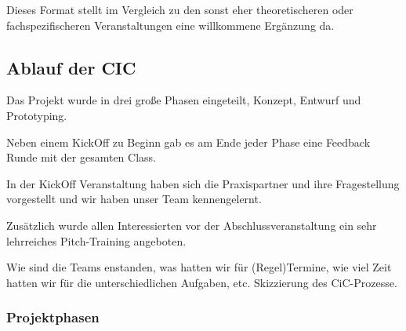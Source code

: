     \vspace{1em}
    \vspace{1em}

    Dieses Format stellt im Vergleich zu den sonst eher theoretischeren oder fachspezifischeren Veranstaltungen eine willkommene Ergänzung da.

    \subsection{Ablauf der CIC}

        Das Projekt wurde in drei große Phasen eingeteilt, Konzept, Entwurf und Prototyping.

        Neben einem KickOff zu Beginn gab es am Ende jeder Phase eine Feedback Runde mit der gesamten Class.
        
        In der KickOff Veranstaltung haben sich die Praxispartner und ihre Fragestellung vorgestellt und wir haben unser Team kennengelernt.



        Zusätzlich wurde allen Interessierten vor der Abschlussveranstaltung ein sehr lehrreiches Pitch-Training angeboten.

        Wie sind die Teams enstanden, was hatten wir für (Regel)Termine, wie viel Zeit hatten wir für die unterschiedlichen Aufgaben, etc.
        Skizzierung des CiC-Prozesse.

    \subsubsection{Projektphasen}

